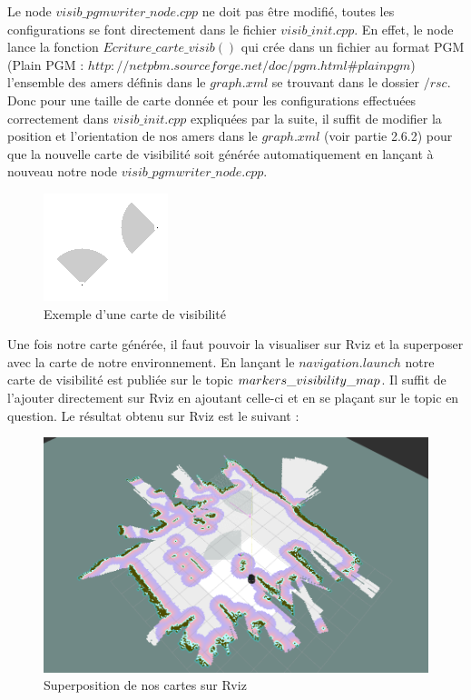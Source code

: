 \documentclass[10pt,a4paper]{article}
\begin{document}
Le node $visib\_pgmwriter\_node.cpp$ ne doit pas être modifié, toutes les configurations se font directement dans le fichier $visib\_init.cpp$. En effet, le node lance la fonction $Ecriture\_carte\_visib()$ qui crée dans un fichier au format PGM (Plain PGM : $http://netpbm.sourceforge.net/doc/pgm.html\#plainpgm$) l'ensemble des amers définis dans le $graph.xml$ se trouvant dans le dossier $/rsc$. Donc pour une taille de carte donnée et pour les configurations effectuées correctement dans $visib\_init.cpp$  expliquées par la suite, il suffit de modifier la position et l'orientation de nos amers dans le $graph.xml$ (voir partie 2.6.2) pour que la nouvelle carte de visibilité soit générée automatiquement en lançant à nouveau notre node $visib\_pgmwriter\_node.cpp$.\\

\begin{figure}[!h]
\center
\includegraphics{figures/visib.png} 
\caption{Exemple d'une carte de visibilité}	
\end{figure}

Une fois notre carte générée, il faut pouvoir la visualiser sur Rviz et la superposer avec la carte de notre environnement. En lançant le $navigation.launch$ notre carte de visibilité est publiée sur le topic $\/markers\_visibility\_map$. Il suffit de l'ajouter directement sur Rviz en ajoutant celle-ci et en se plaçant sur le topic en question. Le résultat obtenu sur Rviz est le suivant :

\begin{figure}[!h]
\center
\includegraphics[scale=0.4]{figures/visib_rviz.png} 
\caption{Superposition de nos cartes sur Rviz}	
\end{figure}
\end{document}

